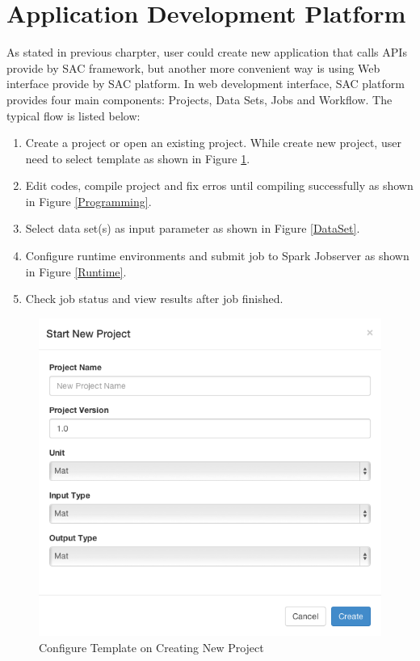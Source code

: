 \section{Application Development Platform}

As stated in previous charpter, user could create new application that calls APIs provide by SAC framework, but another more convenient way is using Web interface provide by SAC platform. In web development interface, SAC platform provides four main components: Projects, Data Sets, Jobs and Workflow. The typical flow is listed below:

\begin{enumerate}
  \item Create a project or open an existing project. While create new project, user need to select template as shown in Figure \ref{NewProject}.
  \item Edit codes, compile project and fix erros until compiling successfully as shown in Figure \ref{Programming}.
  \item Select data set(s) as input parameter as shown in Figure \ref{DataSet}.
  \item Configure runtime environments and submit job to Spark Jobserver as shown in Figure \ref{Runtime}.
  \item Check job status and view results after job finished.
\end{enumerate}

\begin{figure}[H]
\includegraphics[scale=.60]{figures/NewProject.png}
\caption{Configure Template on Creating New Project}
\label{NewProject}
\end{figure}


